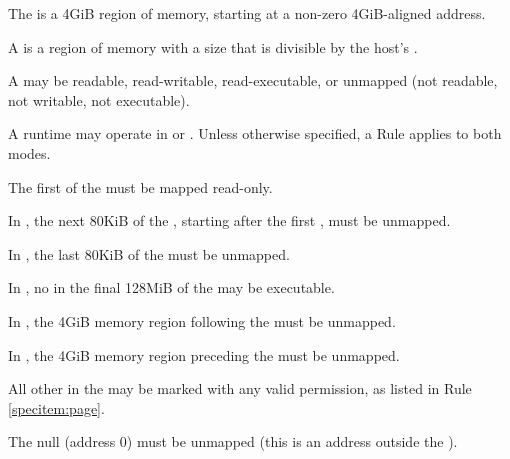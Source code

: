 


\specitem
The  is a 4GiB region of memory, starting at a non-zero 4GiB-aligned address.

\specitem
A  is a region of memory with a size that is divisible by the host's
.


\specitem
\label{specitem:page}
A  may be readable, read-writable, read-executable, or unmapped
(not readable, not writable, not executable).

\specitem
A runtime may operate in  or . Unless otherwise specified, a Rule applies to both modes.


\specitem
The first  of the  must be mapped read-only.

\specitem
In , the next 80KiB of the , starting after
the first , must be unmapped.

\specitem
In , the last 80KiB of the  must be unmapped.

\specitem
In , no  in the final 128MiB of the  may be executable.

\specitem
In , the 4GiB memory region following the  must be unmapped.

\specitem
In , the 4GiB memory region preceding the  must be unmapped.

\specitem
All other  in the  may be marked with any valid permission, as listed in Rule \ref{specitem:page}.

\specitem
The null  (address 0) must be unmapped (this is an address outside the ).


